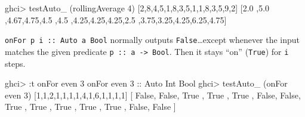 \documentclass[]{article}
\newenvironment{Shaded}{}{}
\newcommand{\DataTypeTok}[1]{\textcolor[rgb]{0.56,0.13,0.00}{{#1}}}
\newcommand{\DecValTok}[1]{\textcolor[rgb]{0.25,0.63,0.44}{{#1}}}
\newcommand{\FloatTok}[1]{\textcolor[rgb]{0.25,0.63,0.44}{{#1}}}
\newcommand{\OtherTok}[1]{\textcolor[rgb]{0.00,0.44,0.13}{{#1}}}
\newcommand{\FunctionTok}[1]{\textcolor[rgb]{0.02,0.16,0.49}{{#1}}}
\newcommand{\NormalTok}[1]{{#1}}
\renewcommand{\href}[2]{#2\footnote{\url{#1}}}
\begin{document}
\begin{Shaded}
\begin{Highlighting}[]
\NormalTok{ghci}\FunctionTok{>} \NormalTok{testAuto_ (rollingAverage }\DecValTok{4}\NormalTok{) [}\DecValTok{2}\NormalTok{,}\DecValTok{8}\NormalTok{,}\DecValTok{4}\NormalTok{,}\DecValTok{5}\NormalTok{,}\DecValTok{1}\NormalTok{,}\DecValTok{8}\NormalTok{,}\DecValTok{3}\NormalTok{,}\DecValTok{5}\NormalTok{,}\DecValTok{1}\NormalTok{,}\DecValTok{1}\NormalTok{,}\DecValTok{8}\NormalTok{,}\DecValTok{3}\NormalTok{,}\DecValTok{5}\NormalTok{,}\DecValTok{9}\NormalTok{,}\DecValTok{2}\NormalTok{]}
\NormalTok{[}\FloatTok{2.0} \NormalTok{,}\FloatTok{5.0} \NormalTok{,}\FloatTok{4.67}\NormalTok{,}\FloatTok{4.75}\NormalTok{,}\FloatTok{4.5}
\NormalTok{,}\FloatTok{4.5} \NormalTok{,}\FloatTok{4.25}\NormalTok{,}\FloatTok{4.25}\NormalTok{,}\FloatTok{4.25}\NormalTok{,}\FloatTok{2.5}
\NormalTok{,}\FloatTok{3.75}\NormalTok{,}\FloatTok{3.25}\NormalTok{,}\FloatTok{4.25}\NormalTok{,}\FloatTok{6.25}\NormalTok{,}\FloatTok{4.75}\NormalTok{]}
\end{Highlighting}
\end{Shaded}

\begin{description}
\tightlist
\item[\href{https://github.com/mstksg/inCode/tree/master/code-samples/machines/Auto.hs\#L125-146}{onFor}]
\texttt{onFor\ p\ i\ ::\ Auto\ a\ Bool} normally outputs
\texttt{False}\ldots{}except whenever the input matches the given predicate
\texttt{p\ ::\ a\ -\textgreater{}\ Bool}. Then it stays ``on'' (\texttt{True})
for \texttt{i} steps.
\end{description}

\begin{Shaded}
\begin{Highlighting}[]
\NormalTok{ghci}\FunctionTok{>} \FunctionTok{:}\NormalTok{t onFor even }\DecValTok{3}
\NormalTok{onFor even }\DecValTok{3}\OtherTok{ ::} \DataTypeTok{Auto} \DataTypeTok{Int} \DataTypeTok{Bool}
\NormalTok{ghci}\FunctionTok{>} \NormalTok{testAuto_ (onFor even }\DecValTok{3}\NormalTok{) [}\DecValTok{1}\NormalTok{,}\DecValTok{1}\NormalTok{,}\DecValTok{2}\NormalTok{,}\DecValTok{1}\NormalTok{,}\DecValTok{1}\NormalTok{,}\DecValTok{1}\NormalTok{,}\DecValTok{1}\NormalTok{,}\DecValTok{4}\NormalTok{,}\DecValTok{1}\NormalTok{,}\DecValTok{6}\NormalTok{,}\DecValTok{1}\NormalTok{,}\DecValTok{1}\NormalTok{,}\DecValTok{1}\NormalTok{,}\DecValTok{1}\NormalTok{]}
\NormalTok{[ }\DataTypeTok{False}\NormalTok{, }\DataTypeTok{False}\NormalTok{, }\DataTypeTok{True} \NormalTok{, }\DataTypeTok{True} \NormalTok{, }\DataTypeTok{True}
\NormalTok{, }\DataTypeTok{False}\NormalTok{, }\DataTypeTok{False}\NormalTok{, }\DataTypeTok{True} \NormalTok{, }\DataTypeTok{True} \NormalTok{, }\DataTypeTok{True}
\NormalTok{, }\DataTypeTok{True} \NormalTok{, }\DataTypeTok{True} \NormalTok{, }\DataTypeTok{False}\NormalTok{, }\DataTypeTok{False} \NormalTok{]}
\end{Highlighting}
\end{Shaded}
\end{document}
